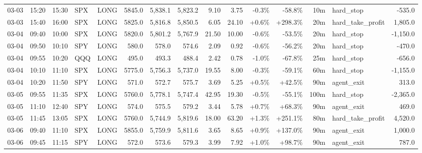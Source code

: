 \documentclass[11pt,a4paper,twoside]{article}
\begin{document}
\begin{landscape}
\begin{center}
\begin{longtable}{>{\color{txtmain}}l l l l l r r r r r r r r >{\color{txtmain}}l r}
03-03 & 15:20 & 15:30 & SPX & LONG & 5845.0 & 5,838.1 & 5,823.2 & 9.10 & 3.75 & \textcolor{lossred}{-0.3\%} & \textcolor{lossred}{-58.8\%} & 10m & hard\_stop & \textcolor{lossred}{-535.0} \\
03-03 & 15:40 & 16:00 & SPX & LONG & 5825.0 & 5,816.8 & 5,850.5 & 6.05 & 24.10 & \textcolor{wingreen}{+0.6\%} & \textcolor{wingreen}{+298.3\%} & 20m & hard\_take\_profit & \textcolor{wingreen}{1,805.0} \\
03-04 & 09:40 & 10:00 & SPX & LONG & 5820.0 & 5,801.2 & 5,767.9 & 21.50 & 10.00 & \textcolor{lossred}{-0.6\%} & \textcolor{lossred}{-53.5\%} & 20m & hard\_stop & \textcolor{lossred}{-1,150.0} \\
03-04 & 09:50 & 10:10 & SPY & LONG & 580.0 & 578.0 & 574.6 & 2.09 & 0.92 & \textcolor{lossred}{-0.6\%} & \textcolor{lossred}{-56.2\%} & 20m & hard\_stop & \textcolor{lossred}{-470.0} \\
03-04 & 09:55 & 10:20 & QQQ & LONG & 495.0 & 493.3 & 488.4 & 2.42 & 0.78 & \textcolor{lossred}{-1.0\%} & \textcolor{lossred}{-67.8\%} & 25m & hard\_stop & \textcolor{lossred}{-656.0} \\
03-04 & 10:10 & 11:10 & SPX & LONG & 5775.0 & 5,756.3 & 5,737.0 & 19.55 & 8.00 & \textcolor{lossred}{-0.3\%} & \textcolor{lossred}{-59.1\%} & 60m & hard\_stop & \textcolor{lossred}{-1,155.0} \\
03-04 & 10:20 & 11:50 & SPY & LONG & 571.0 & 572.7 & 575.7 & 3.69 & 5.25 & \textcolor{wingreen}{+0.5\%} & \textcolor{wingreen}{+42.5\%} & 90m & agent\_exit & \textcolor{wingreen}{313.0} \\
03-05 & 09:55 & 11:35 & SPX & LONG & 5760.0 & 5,778.1 & 5,747.4 & 42.95 & 19.30 & \textcolor{lossred}{-0.5\%} & \textcolor{lossred}{-55.1\%} & 100m & hard\_stop & \textcolor{lossred}{-2,365.0} \\
03-05 & 11:10 & 12:40 & SPY & LONG & 574.0 & 575.5 & 579.2 & 3.44 & 5.78 & \textcolor{wingreen}{+0.7\%} & \textcolor{wingreen}{+68.3\%} & 90m & agent\_exit & \textcolor{wingreen}{469.0} \\
03-05 & 11:45 & 13:05 & SPX & LONG & 5760.0 & 5,744.9 & 5,819.6 & 18.00 & 63.20 & \textcolor{wingreen}{+1.3\%} & \textcolor{wingreen}{+251.1\%} & 80m & hard\_take\_profit & \textcolor{wingreen}{4,520.0} \\
03-06 & 09:40 & 11:10 & SPX & LONG & 5855.0 & 5,759.9 & 5,811.6 & 3.65 & 8.65 & \textcolor{wingreen}{+0.9\%} & \textcolor{wingreen}{+137.0\%} & 90m & agent\_exit & \textcolor{wingreen}{1,000.0} \\
03-06 & 09:45 & 11:15 & SPY & LONG & 572.0 & 573.6 & 579.3 & 3.99 & 7.92 & \textcolor{wingreen}{+1.0\%} & \textcolor{wingreen}{+98.7\%} & 90m & agent\_exit & \textcolor{wingreen}{787.0} \\

\end{longtable}
\end{center}
\end{landscape}
\end{document}
